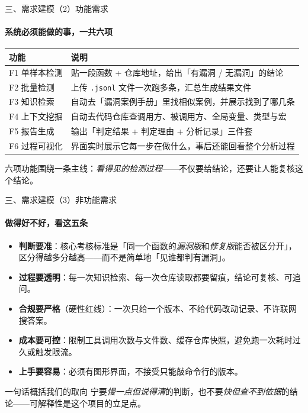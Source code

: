 \documentclass{beamer}
\begin{document}
\begin{frame}{三、需求建模（2）功能需求}
\framesubtitle{系统必须能做的事，一共六项}
\centering
\footnotesize
\begin{tabular}{@{}p{}p{}@{}}
\toprule
\textbf{功能} & \textbf{说明} \\
\midrule
F1 单样本检测 & 贴一段函数 + 仓库地址，给出「有漏洞 / 无漏洞」的结论 \\
F2 批量检测     & 上传 \texttt{.jsonl} 文件一次跑多条，汇总生成结果文件 \\
F3 知识检索     & 自动去「漏洞案例手册」里找相似案例，并展示找到了哪几条 \\
F4 上下文挖掘   & 自动去代码仓库查调用方、被调用方、全局变量、类型与宏 \\
F5 报告生成     & 输出「判定结果 + 判定理由 + 分析记录」三件套 \\
F6 过程可视化   & 界面实时展示它每一步在做什么，事后还能回看整个分析过程 \\
\bottomrule
\end{tabular}
\vspace{0.6em}

{\footnotesize 六项功能围绕一条主线：\emph{看得见的检测过程}——不仅要给结论，还要让人能复核这个结论。}
\end{frame}

\begin{frame}{三、需求建模（3）非功能需求}
\framesubtitle{做得好不好，看这五条}
\small
\begin{itemize}
\item \textbf{判断要准}：核心考核标准是「同一个函数的\emph{漏洞版}和\emph{修复版}能否被区分开」，
      区分得越多分越高——而不是简单地「见谁都判有漏洞」。
\item \textbf{过程要透明}：每一次知识检索、每一次仓库读取都要留痕，结论可复核、可追问。
\item \textbf{合规要严格}（硬性红线）：一次只给一个版本、不给代码改动记录、不许联网搜答案。
\item \textbf{成本要可控}：限制工具调用次数与文件数、缓存仓库快照，避免跑一次耗时过久或触发限流。
\item \textbf{上手要容易}：\alert{必须有图形界面}，不接受只能敲命令行的版本。
\end{itemize}
\vspace{0.2em}
\begin{block}{一句话概括我们的取向}
宁要\emph{慢一点但说得清}的判断，也不要\emph{快但查不到依据}的结论——可解释性是这个项目的立足点。
\end{block}
\end{frame}
\end{document}
